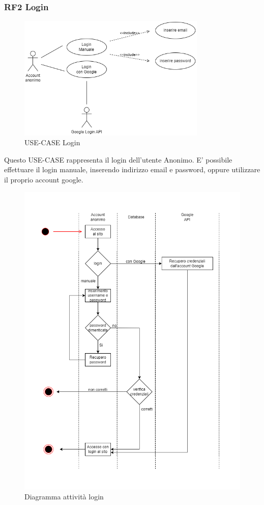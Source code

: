 \documentclass[a4paper,12pt]{article}
\begin{document}
\subsubsection*{RF2 Login}
\begin{figure}[H]
   \centering
   \includegraphics[width=0.8\textwidth]{img-D2/login_anonimo.png}
    \caption{USE-CASE Login}
\end{figure}

Questo USE-CASE rappresenta il login dell'utente Anonimo.
E' possibile effettuare il login manuale, inserendo indirizzo email e password, oppure utilizzare il proprio account google.

\begin{figure}[H]
   \centering
    \includegraphics[width=1\textwidth]{img-D2/diagramma_login.png}
    \caption{ Diagramma attività login}
\end{figure}
\end{document}
